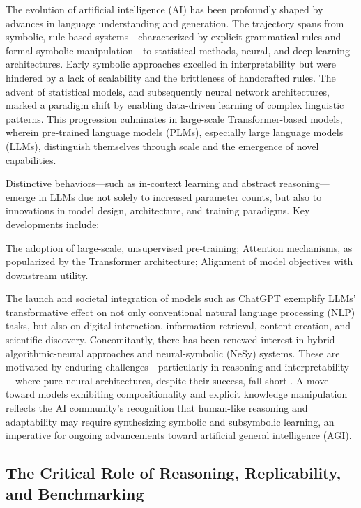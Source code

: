 \documentclass[sigconf]{acmart}
\begin{document}
The evolution of artificial intelligence (AI) has been profoundly shaped by advances in language understanding and generation. The trajectory spans from symbolic, rule-based systems—characterized by explicit grammatical rules and formal symbolic manipulation—to statistical methods, neural, and deep learning architectures. Early symbolic approaches excelled in interpretability but were hindered by a lack of scalability and the brittleness of handcrafted rules. The advent of statistical models, and subsequently neural network architectures, marked a paradigm shift by enabling data-driven learning of complex linguistic patterns. This progression culminates in large-scale Transformer-based models, wherein pre-trained language models (PLMs), especially large language models (LLMs), distinguish themselves through scale and the emergence of novel capabilities.

Distinctive behaviors—such as in-context learning and abstract reasoning—emerge in LLMs due not solely to increased parameter counts, but also to innovations in model design, architecture, and training paradigms. Key developments include:

The adoption of large-scale, unsupervised pre-training;
Attention mechanisms, as popularized by the Transformer architecture;
Alignment of model objectives with downstream utility.

The launch and societal integration of models such as ChatGPT exemplify LLMs' transformative effect on not only conventional natural language processing (NLP) tasks, but also on digital interaction, information retrieval, content creation, and scientific discovery. Concomitantly, there has been renewed interest in hybrid algorithmic-neural approaches and neural-symbolic (NeSy) systems. These are motivated by enduring challenges—particularly in reasoning and interpretability—where pure neural architectures, despite their success, fall short \cite{ref42,ref49,ref54,ref86}. A move toward models exhibiting compositionality and explicit knowledge manipulation reflects the AI community’s recognition that human-like reasoning and adaptability may require synthesizing symbolic and subsymbolic learning, an imperative for ongoing advancements toward artificial general intelligence (AGI).

\subsection{The Critical Role of Reasoning, Replicability, and Benchmarking}
\end{document}
